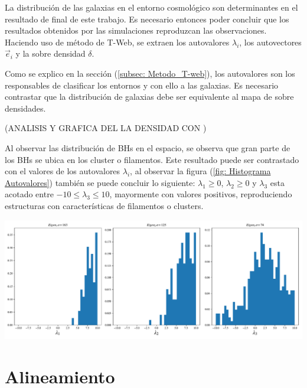 La distribución de las galaxias en el entorno cosmológico son determinantes en el resultado de final de este trabajo. Es necesario entonces poder concluir que los resultados obtenidos por las simulaciones reproduzcan las observaciones. Haciendo uso de método de T-Web, se extraen los autovalores $\lambda_{i}$, los autovectores $\vec{e}_{i}$ y la sobre densidad $\delta$. 

Como se explico en la sección (\ref{subsec: Metodo_T-web}),  los autovalores son los responsables de clasificar los entornos y con ello a las galaxias. Es necesario contrastar que la distribución de galaxias debe ser equivalente al mapa de sobre densidades. 

(ANALISIS Y GRAFICA DEL LA DENSIDAD CON )

Al observar las distribución de BHs en el espacio, se observa que gran parte de los BHs se ubica en los cluster o filamentos. Este resultado puede ser contrastado con el valores de los autovalores $\lambda_{i}$, al observar la figura (\ref{fig: Histograma Autovalores}) también se puede concluir lo siguiente:  $\lambda_{1}\geq 0$,  $\lambda_{2}\geq 0$ y $\lambda_{3}$ esta acotado entre $-10 \leq \lambda_{3}\leq 10$, mayormente con valores positivos, reproduciendo estructuras con características de filamentos o clusters. 
%
\begin{center}
\includegraphics[scale=.38]{./figures/6_Resultados/cosmo01/histograma_autovalores2.pdf}
\label{fig: Histograma Autovalores}
\end{center}
%




\section{ Alineamiento}
\label{sec: Alineamiento}


